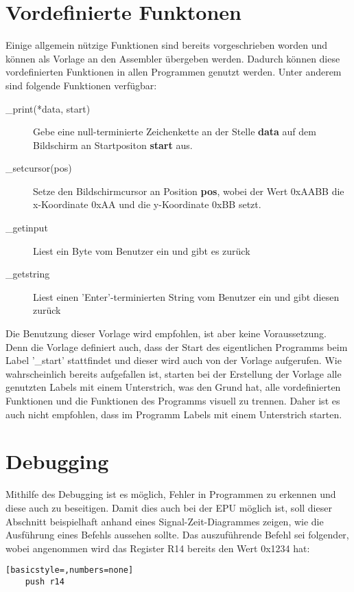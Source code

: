 \section{Vordefinierte Funktonen}
Einige allgemein nützige Funktionen sind bereits vorgeschrieben worden und
können als Vorlage an den Assembler übergeben werden. Dadurch können diese
vordefinierten Funktionen in allen Programmen genutzt werden. Unter anderem sind
folgende Funktionen verfügbar:
\begin{description}
\item [\_print(*data, start)] Gebe eine null-terminierte Zeichenkette an der
Stelle \textbf{data} auf dem Bildschirm an Startpositon \textbf{start}
aus.
\item [\_setcursor(pos)] Setze den Bildschirmcursor an Position \textbf{pos},
	wobei der Wert 0xAABB die x-Koordinate 0xAA und die y-Koordinate 0xBB setzt.
\item [\_getinput] Liest ein Byte vom Benutzer ein und gibt es zurück
\item [\_getstring] Liest einen 'Enter'-terminierten String vom Benutzer ein und
	gibt diesen zurück
\end{description}
Die Benutzung dieser Vorlage wird empfohlen, ist aber keine Voraussetzung. Denn
die Vorlage definiert auch, dass der Start des eigentlichen Programms beim Label
'\_start' stattfindet und dieser wird auch von der Vorlage aufgerufen. Wie
wahrscheinlich bereits aufgefallen ist, starten bei der Erstellung der Vorlage
alle genutzten Labels mit einem Unterstrich, was den Grund hat, alle
vordefinierten Funktionen und die Funktionen des Programms visuell zu trennen.
Daher ist es auch nicht empfohlen, dass im Programm Labels mit einem Unterstrich
starten.
\pagebreak
\section{Debugging}
Mithilfe des Debugging ist es möglich, Fehler in Programmen zu erkennen und
diese auch zu beseitigen. Damit dies auch bei der \ac{EPU} möglich ist, soll
dieser Abschnitt beispielhaft anhand eines Signal-Zeit-Diagrammes zeigen, wie die
Ausführung eines Befehls aussehen sollte.
Das auszuführende Befehl sei folgender, wobei angenommen wird das Register R14
bereits den Wert 0x1234 hat:
\begin{lstlisting}[basicstyle=,numbers=none]
	push r14
\end{lstlisting}

